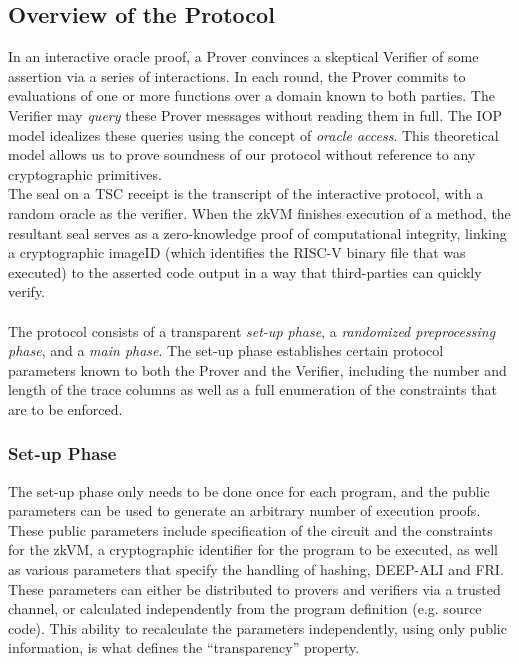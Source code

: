 \documentclass[10pt,letterpaper,titlepage]{article}
\theoremstyle{definition}
\begin{document}
\subsection{Overview of the Protocol}
In an interactive oracle proof, a Prover convinces a skeptical Verifier of some assertion via a series of interactions. 
In each round, the Prover commits to evaluations of one or more functions over a domain known to both parties. 
The Verifier may \textit{query} these Prover messages without reading them in full. 
The IOP model idealizes these queries using the concept of \textit{oracle access}. 
This theoretical model allows us to prove soundness of our protocol without reference to any cryptographic primitives.%
\\
The seal on a TSC receipt is the transcript of the interactive protocol, with a random oracle as the verifier.
When the zkVM finishes execution of a method, the resultant seal serves as a zero-knowledge proof of computational integrity, linking a cryptographic imageID (which identifies the RISC-V binary file that was executed) to the asserted code output in a way that third-parties can quickly verify.\\
\\
The protocol consists of a transparent \textit{set-up phase}, a \textit{randomized preprocessing phase}, and a \textit{main phase}. 
The set-up phase establishes certain protocol parameters known to both the Prover and the Verifier, including the number and length of the trace columns as well as a full enumeration of the constraints that are to be enforced.

\subsubsection{Set-up Phase}
The set-up phase only needs to be done once for each program, and the public parameters can be used to generate an arbitrary number of execution proofs. 
These public parameters include specification of the circuit and the constraints for the zkVM, a cryptographic identifier for the program to be executed, as well as various parameters that specify the handling of hashing, DEEP-ALI and FRI.  
These parameters can either be distributed to provers and verifiers via a trusted channel, or calculated independently from the program definition (e.g. source code).
This ability to recalculate the parameters independently, using only public information, is what defines the ``transparency'' property.
\end{document}
